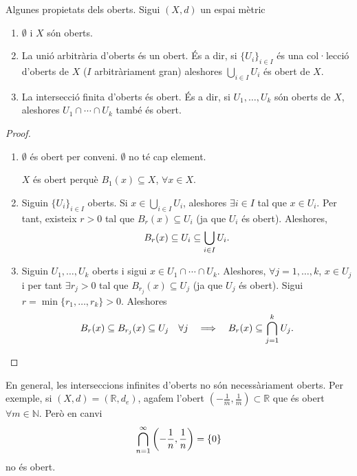 \documentclass[../main.tex]{subfiles}
\begin{document}
\begin{prop}
\label{prop:propietatsoberts}
Algunes propietats dels oberts. Sigui $(X,d)$ un espai mètric
\begin{enumerate}[(1)]
    \item $\emptyset$ i $X$ són oberts.
    \item La unió arbitrària d'oberts és un obert. És a dir, si $\{U_i\}_{i\in I}$ és una col·lecció d'oberts de $X$ ($I$ arbitràriament gran) aleshores $\bigcup_{i\in I} U_i$ és obert de $X$.
    \item La intersecció finita d'oberts és obert. És a dir, si $U_1,\ldots,U_k$ són oberts de $X$, aleshores $U_1\cap \cdots \cap U_k$ també és obert.
\end{enumerate}
\end{prop}
\begin{proof}
\begin{enumerate}[(1)]
    \item $\emptyset$ és obert per conveni. $\emptyset$ no té cap element.
    
    $X$ és obert perquè $B_1(x)\subseteq X$, $\forall x\in X$.
    
    \item Siguin $\{U_i\}_{i\in I}$ oberts. Si $x\in \bigcup_{i\in I}U_i$, aleshores $\exists i\in I$ tal que $x\in U_i$. Per tant, existeix $r>0$ tal que $B_r(x)\subseteq U_i$ (ja que $U_i$ és obert). Aleshores,
    \begin{equation}
        \notag
        B_r(x)\subseteq U_i\subseteq \bigcup_{i\in I}U_i.
    \end{equation}
    
    \item Siguin $U_1,\ldots,U_k$ oberts i sigui $x\in U_1\cap \cdots\cap U_k$. Aleshores, $\forall j = 1,\ldots,k$, $x\in U_j$ i per tant $\exists r_j>0$ tal que $B_{r_j}(x)\subseteq U_j$ (ja que $U_j$ és obert). Sigui $r = \min\{r_1,\ldots,r_k\}>0$. Aleshores
    \begin{equation}
        \notag
        B_r(x)\subseteq B_{r_j}(x)\subseteq U_j\quad \forall j\quad \Longrightarrow \quad B_r(x)\subseteq \bigcap_{j=1}^kU_j.
    \end{equation}
\end{enumerate}
\end{proof}



\begin{nota}
En general, les interseccions infinites d'oberts no són necessàriament oberts. Per exemple, si $(X,d) = (\mathbb{R},d_e)$, agafem l'obert $\left(-\frac{1}{m},\frac{1}{m}\right)\subset \mathbb{R}$ que és obert $\forall m\in\mathbb{N}$. Però en canvi
\begin{equation}
    \notag
    \bigcap_{n=1}^\infty \left(-\frac{1}{n},\frac{1}{n}\right) = \{0\}
\end{equation}
no és obert.
\end{nota}
\end{document}
